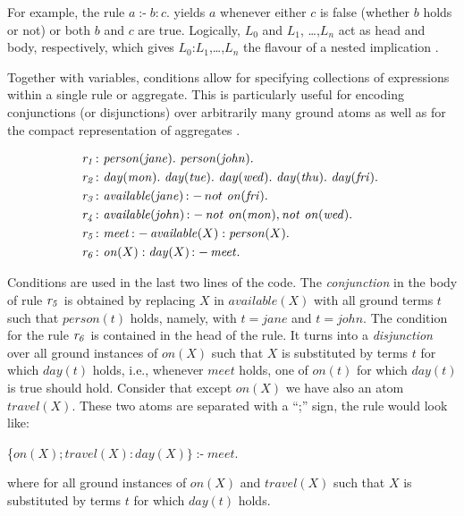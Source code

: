 \documentclass[a4paper, titlepage]{article}
\DeclareMathOperator{\leftimpl}{:-}
\newcommand{\row}[1]{%
  \ensuremath{\it \color{black} #1 \color{black}}%
}
\begin{document}
For example, the rule $\mathit{a \leftimpl b : c.}$ yields 
$a$ whenever either $c$ is false (whether $b$ holds or not) 
or both $b$ and $c$ are true. Logically, $L_0$ and $L_1$,
\dots,$L_n$ act as head and body, respectively, which gives 
$L_0$:$L_1$,\dots,$L_n$ the flavour of a nested implication 
\cite{gkklorst2015}.

Together  with variables, conditions allow for specifying 
collections of expressions within a single rule or 
aggregate. This is particularly useful for encoding 
conjunctions (or disjunctions) over arbitrarily many ground 
atoms as well as for the compact representation of 
aggregates \cite{gkklorst2015}. 
\begin{exmp}
\begin{align*}
\row{r_1}\colon& \mathit{person}(\mathit{jane}). \  \mathit{person}
(\mathit{john}).\\
\row{r_2}\colon& \mathit{day}(\mathit{mon}). \ \mathit{day}
(\mathit{tue}). \ \mathit{day}(\mathit{wed}). \ \mathit{day}
(\mathit{thu}). \ \mathit{day}(\mathit{fri}). \ \\
\row{r_3}\colon& \mathit{available}(\mathit{jane}) \leftimpl not \  
\mathit{on}(\mathit{fri}).\\
\row{r_4}\colon& \mathit{available}(\mathit{john}) \leftimpl 
\mathit{not} \ \mathit{on}(\mathit{mon}), \mathit{not} \ 
\mathit{on}(\mathit{wed}).\\
\row{r_5}\colon& \mathit{meet} \leftimpl \mathit{available}(X) : 
\mathit{person}(X).\\
\row{r_6}\colon& \mathit{on}(X) : \mathit{day}(X) \leftimpl 
\mathit{meet}.
\end{align*}
\end{exmp}  
Conditions are used in the last two lines of the code. 
The \emph{conjunction} in the body of rule $\row{r_5}$ is obtained by 
replacing $X$ in $\mathit{available(X)}$ with all ground 
terms $t$ such that $\mathit{person(t)}$ holds, namely, 
with $\mathit{t=jane}$ and $\mathit{t=john}$. The condition 
for the rule $\row{r_6}$ is contained in the head of the rule. It 
turns into a \emph{disjunction} over all ground instances of 
$\mathit{on(X)}$ such that $X$ is substituted by terms $t$ 
for which $\mathit{day(t)}$ holds, i.e., whenever $\mathit{meet}$ holds, one of $\mathit{on(t)}$ for which $\mathit{day(t)}$ is true should hold. Consider that except $\mathit{on(X)}$ we have also an atom $\mathit{travel(X)}$. These two atoms are separated with a ``;'' sign, the rule would look like:
\centerline{\{$\mathit{on}(X);\mathit{travel}(X) : \mathit{day}(X)\} \leftimpl 
\mathit{meet}.$}
where for all ground instances of $\mathit{on(X)}$ and $\mathit{travel(X)}$ such that $X$ is substituted by terms $t$ for which $\mathit{day(t)}$ holds. 
\end{document}
